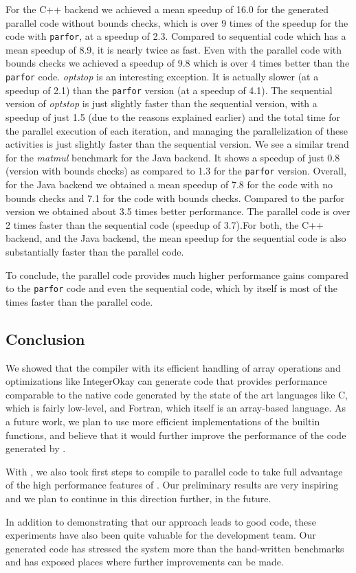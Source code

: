 For the \xten C++ backend we achieved a mean speedup of 16.0 for the
generated parallel \xten code without bounds checks, which is over 9
times of the speedup for the \matlab code with \texttt{parfor}, at a
speedup of 2.3. Compared to \xten sequential code which has a mean
speedup of 8.9, it is nearly twice as fast.  Even with the parallel
\xten code with bounds checks we achieved a speedup of 9.8 which is over 4
times better than the \matlab \texttt{parfor} code.  \emph{optstop} is
an interesting exception. It is actually slower (at a speedup of 2.1)
than the \matlab \texttt{parfor} version (at a speedup of 4.1). The
sequential version of \emph{optstop} is just slightly faster than the
sequential \matlab version, with a speedup of just 1.5 (due to the
reasons explained earlier) and the total time for the parallel execution
of each iteration, and managing the parallelization of these activities
is just slightly faster than the sequential version. We see a similar
trend for the \emph{matmul} benchmark for the \xten Java backend. It
shows a speedup of just 0.8 (version with bounds checks) as compared to
1.3 for the \matlab \texttt{parfor} version. Overall, for the Java
backend we obtained a mean speedup of 7.8 for the \xten code with no
bounds checks and 7.1 for the code with bounds checks. Compared to the
\matlab parfor version we obtained about 3.5 times better performance. The
parallel \xten code is over 2 times faster than the sequential \xten
code (speedup of 3.7).For both, the C++ backend, and the Java backend,
the mean speedup for the sequential \xten code is also substantially
faster than the \matlab parallel code.  

To conclude, the parallel \xten code provides much higher performance
gains compared to the \matlab \texttt{parfor} code  and even the \xten
sequential code, which by itself is most of the times faster than the
\matlab parallel code.


\subsection{Conclusion}

We showed that the \mixten compiler with its efficient handling of array
operations and optimizations like IntegerOkay can generate \xten code
that provides performance comparable to the native code generated by the
state of the art languages like C, which is fairly low-level, and
Fortran, which itself is an array-based language.  As a future work, we
plan to use more efficient implementations of the builtin functions, and
believe that it would further improve the performance of the code
generated by \mixten.

With \mixten, we also took first steps to compile \matlab to parallel
\xten code to take full advantage of the high performance features of
\xten. Our preliminary results are very inspiring and we plan to
continue in this direction further, in the future.

In addition to demonstrating that our approach leads to good code, these
experiments have also been quite valuable for the \xten development team.
Our generated code has stressed the \xten system more than the
hand-written \xten benchmarks and has exposed places where further
improvements can be made.
